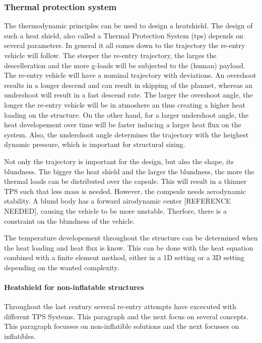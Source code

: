 \subsubsection{Thermal protection system}
The thermodynamic principles can be used to design a heatshield. The design of such a heat shield, also called a Thermal Protection System (\gls{tps}) depends on several parameters. In general it all comes down to the trajectory the re-entry vehicle will follow. The steeper the re-entry trajectory, the larges the descelleration and the more g-loads will be subjected to the (human) payload. The re-entry vehicle will have a nominal trajectory with deviations. An overshoot results in a longer descend and can result in skipping of the plannet, whereas an undershoot will result in a fast descend rate. The larger the overshoot angle, the longer the re-entry vehicle will be in atmoshere an thus creating a higher heat loading on the structure. On the other hand, for a larger undershoot angle, the heat developement over time will be faster inducing a larger heat flux on the system. Also, the undershoot angle determines the trajectory with the heighest dynamic pressure, which is important for structural sizing. 

Not only the trajectory is important for the design, but also the shape, its blundness. The bigger the heat shield and the larger the blundness, the more the  thermal loads can be distributed over the capsule. This will result in a thinner TPS such that less mass is needed. However, the compsule needs aerodynamic stability. A blund body has a forward airodynamic center [REFERENCE NEEDED], causing the vehicle to be more unstable. Therfore, there is a constraint on the blundness of the vehicle.

The temperature developement throughout the structure can be determined when the heat loading and heat flux is know. This can be done with the heat equation combined with a finite element method, either in a 1D setting or a 3D setting depending on the wanted complexity.

\paragraph{Heatshield for non-inflatable structures}
Throughout the last century several re-entry attempts have excecuted with different TPS Systems. This paragraph and the next focus on several concepts. This paragraph focusses on non-inflatible solutions and the next focusses on inflatibles. 



